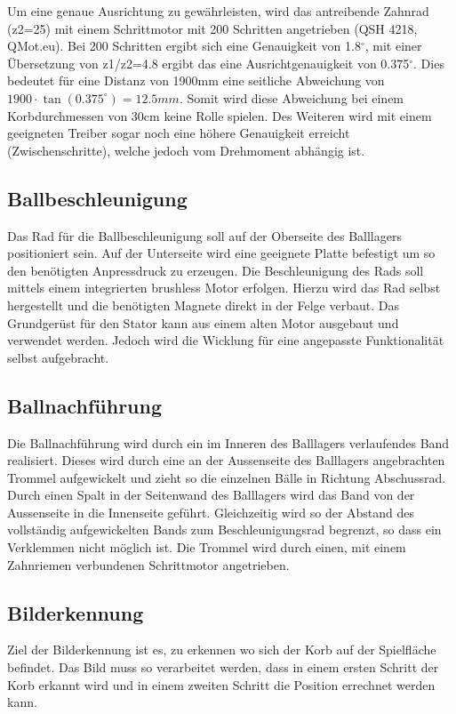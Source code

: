 Um eine genaue Ausrichtung zu gewährleisten, wird das antreibende Zahnrad 
(z2=25) mit einem Schrittmotor mit 200 Schritten angetrieben (QSH 4218, 
QMot.eu). Bei 200 Schritten ergibt sich eine Genauigkeit von 1.8$^\circ$, mit einer 
Übersetzung von z1/z2=4.8 ergibt das eine Ausrichtgenauigkeit von 0.375$^\circ$. Dies 
bedeutet für eine Distanz von 1900mm eine seitliche Abweichung von 
$1900 \cdot \tan(0.375^\circ)= 12.5mm$. Somit wird diese Abweichung bei einem 
Korbdurchmessen von 30cm keine Rolle spielen. Des Weiteren wird mit einem 
geeigneten Treiber sogar noch eine höhere Genauigkeit erreicht 
(Zwischenschritte), welche jedoch vom Drehmoment abhängig ist. 

\subsection{Ballbeschleunigung}
Das Rad für die Ballbeschleunigung soll auf der Oberseite des Balllagers 
positioniert sein. Auf der Unterseite wird eine geeignete Platte befestigt um 
so den benötigten Anpressdruck zu erzeugen. 
Die Beschleunigung des Rads soll mittels einem integrierten brushless Motor erfolgen. Hierzu wird das Rad selbst hergestellt und die benötigten Magnete direkt in der Felge verbaut. Das Grundgerüst für den Stator kann aus einem alten Motor ausgebaut und verwendet werden. Jedoch wird die Wicklung für eine angepasste Funktionalität selbst aufgebracht.

\subsection{Ballnachführung}
Die Ballnachführung wird durch ein im Inneren des Balllagers verlaufendes Band 
realisiert. Dieses wird durch eine an der Aussenseite des Balllagers 
angebrachten Trommel aufgewickelt und zieht so die einzelnen Bälle in Richtung 
Abschussrad. Durch einen Spalt in der Seitenwand des Balllagers wird das Band 
von der Aussenseite in die Innenseite geführt. Gleichzeitig wird so der 
Abstand des vollständig aufgewickelten Bands zum Beschleunigungsrad begrenzt, 
so dass ein Verklemmen nicht möglich ist.
Die Trommel wird durch einen, mit einem Zahnriemen verbundenen Schrittmotor angetrieben.

\subsection{Bilderkennung}
Ziel der Bilderkennung ist es, zu erkennen wo sich der Korb auf der Spielfläche befindet. Das Bild muss so verarbeitet werden, dass in einem ersten Schritt der Korb erkannt wird und in einem zweiten Schritt die Position errechnet werden kann.
